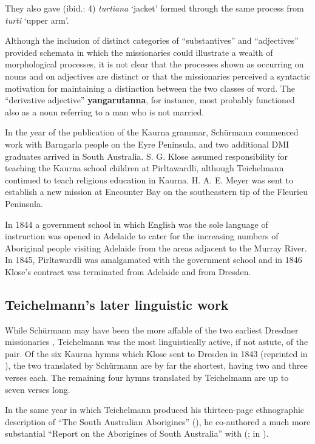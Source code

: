 They also gave (ibid.: 4) \textit{turtiana} `jacket' formed through the same process from \textit{turti} `upper arm'. 

Although the inclusion of distinct categories of “substantives” and “adjectives” provided schemata in which the missionaries could illustrate a wealth of morphological processes, it is not clear that the processes shown as occurring on nouns and on adjectives are distinct or that the missionaries perceived a syntactic motivation for maintaining a distinction between the two classes of word. The ``derivative adjective'' \textbf{yangarutanna}, for instance, most probably functioned also as a noun referring to a man who is not married. 

In the year of the publication of the Kaurna grammar, Schürmann commenced work with Barngarla people on the Eyre Peninsula, and two additional DMI graduates arrived in South Australia. S. G. Klose assumed responsibility for teaching the Kaurna school children at Pirltawardli, although Teichelmann continued to teach religious education in Kaurna. H. A. E. Meyer was sent to establish a new mission at Encounter Bay on the southeastern tip of the Fleurieu Peninsula.

In 1844 a government school in which English was the sole language of instruction was opened in Adelaide to cater for the increasing numbers of Aboriginal people visiting Adelaide from the areas adjacent to the Murray River. In 1845, Pirltawardli was amalgamated with the government school and in 1846 Klose’s contract was terminated from Adelaide and from Dresden.

\subsection{Teichelmann’s later linguistic work}
\label{sec:key:5.2.1}

While Schürmann may have been the more affable of the two earliest Dresdner missionaries \citep{kneebone_language_2005}, Teichelmann was the most linguistically active, if not astute, of the pair. Of the six Kaurna hymns which Klose sent to Dresden in 1843 (reprinted in \citealt[27--30]{graetz2002}), the two translated by Schürmann are by far the shortest, having two and three verses each. The remaining four hymns translated by Teichelmann are up to seven verses long.

In the same year in which Teichelmann produced his thirteen-page ethnographic description of “The South Australian Aborigines” (\citeyear{teichelmann_letter_1841}), he co-authored a much more substantial “Report on the Aborigines of South Australia” with (\citealt{moorhouse_report_1841}; in \citealt[38]{foster_two_1990}). 

